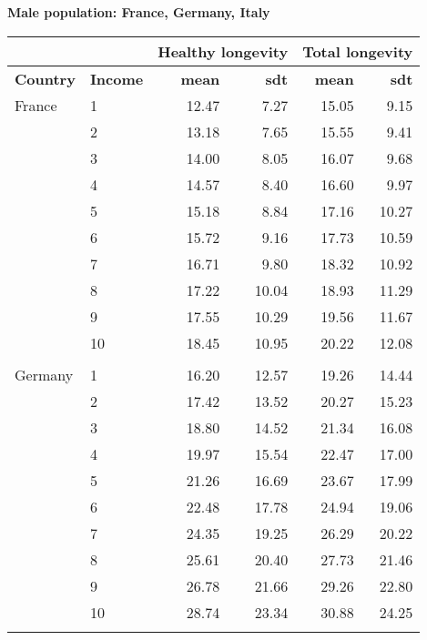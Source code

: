 \begin{table}
\centering \textbf{Male population: France, Germany, Italy}\par\medskip\medskip
\begin{tabular}{llrrrr}
\toprule
& & \multicolumn{2}{l}{Healthy longevity} & \multicolumn{2}{l}{Total longevity} \\
\midrule
\textbf{Country }& \textbf{Income} &  \textbf{mean}       &  \textbf{sdt}     &     \textbf{mean}         & \textbf{sdt}    \\
\midrule
France & 1  &   12.47 &   7.27 &  15.05 &   9.15 \\
            & 2  &   13.18 &   7.65 &  15.55 &   9.41 \\
            & 3  &   14.00 &   8.05 &  16.07 &   9.68 \\
            & 4  &   14.57 &   8.40 &  16.60 &   9.97 \\
            & 5  &   15.18 &   8.84 &  17.16 &  10.27 \\
            & 6  &   15.72 &   9.16 &  17.73 &  10.59 \\
            & 7  &   16.71 &   9.80 &  18.32 &  10.92 \\
            & 8  &   17.22 &  10.04 &  18.93 &  11.29 \\
            & 9  &   17.55 &  10.29 &  19.56 &  11.67 \\
            & 10 &   18.45 &  10.95 &  20.22 &  12.08 \\
  & &    &   &   &  \\
Germany & 1  &   16.20 &  12.57 &  19.26 &  14.44 \\
            & 2  &   17.42 &  13.52 &  20.27 &  15.23 \\
            & 3  &   18.80 &  14.52 &  21.34 &  16.08 \\
            & 4  &   19.97 &  15.54 &  22.47 &  17.00 \\
            & 5  &   21.26 &  16.69 &  23.67 &  17.99 \\
            & 6  &   22.48 &  17.78 &  24.94 &  19.06 \\
            & 7  &   24.35 &  19.25 &  26.29 &  20.22 \\
            & 8  &   25.61 &  20.40 &  27.73 &  21.46 \\
            & 9  &   26.78 &  21.66 &  29.26 &  22.80 \\
            & 10 &   28.74 &  23.34 &  30.88 &  24.25 \\
              & &    &   &   &  \\

\end{tabular}
\end{table}
